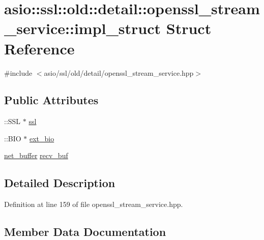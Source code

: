 \hypertarget{structasio_1_1ssl_1_1old_1_1detail_1_1openssl__stream__service_1_1impl__struct}{}\section{asio\+:\+:ssl\+:\+:old\+:\+:detail\+:\+:openssl\+\_\+stream\+\_\+service\+:\+:impl\+\_\+struct Struct Reference}
\label{structasio_1_1ssl_1_1old_1_1detail_1_1openssl__stream__service_1_1impl__struct}


{\ttfamily \#include $<$asio/ssl/old/detail/openssl\+\_\+stream\+\_\+service.\+hpp$>$}

\subsection*{Public Attributes}
\begin{DoxyCompactItemize}
\item 
\+::S\+S\+L $\ast$ \hyperlink{structasio_1_1ssl_1_1old_1_1detail_1_1openssl__stream__service_1_1impl__struct_ad80b27797dc8f5aa013dc54add0153f7}{ssl}
\item 
\+::B\+I\+O $\ast$ \hyperlink{structasio_1_1ssl_1_1old_1_1detail_1_1openssl__stream__service_1_1impl__struct_a46c549183817ecbcab44247ee813c21b}{ext\+\_\+bio}
\item 
\hyperlink{classasio_1_1ssl_1_1old_1_1detail_1_1net__buffer}{net\+\_\+buffer} \hyperlink{structasio_1_1ssl_1_1old_1_1detail_1_1openssl__stream__service_1_1impl__struct_aa23375c5983d48ca327f4052537e39f8}{recv\+\_\+buf}
\end{DoxyCompactItemize}


\subsection{Detailed Description}


Definition at line 159 of file openssl\+\_\+stream\+\_\+service.\+hpp.



\subsection{Member Data Documentation}
\hypertarget{structasio_1_1ssl_1_1old_1_1detail_1_1openssl__stream__service_1_1impl__struct_a46c549183817ecbcab44247ee813c21b}{}
